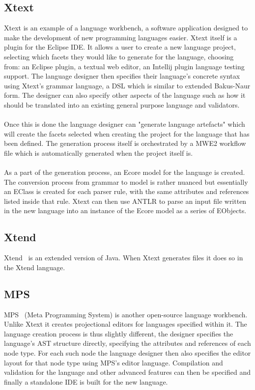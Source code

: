 \documentclass{article}
\begin{document}
\subsection{Xtext}
Xtext is an example of a language workbench, a software application designed to make the development of new programming languages easier. Xtext itself is a plugin for the Eclipse IDE. It allows a user to create a new language project, selecting which facets they would like to generate for the language, choosing from: an Eclipse plugin, a textual web editor, an Intellij plugin language testing support. The language designer then specifies their language's concrete syntax using Xtext's grammar language, a DSL which is similar to extended Bakus-Naur form. The designer can also specify other aspects of the language such as how it should be translated into an existing general purpose language and validators.
\\
\\
Once this is done the language designer can "generate language artefacts" which will create the facets selected when creating the project for the language that has been defined. The generation process itself is orchestrated by a MWE2 workflow file which is automatically generated when the project itself is.
\\
\\
As a part of the generation process, an Ecore model for the language is created. The conversion process from grammar to model is rather nuanced but essentially an EClass is created for each parser rule, with the same attributes and references listed inside that rule. Xtext can then use ANTLR to parse an input file written in the new language into an instance of the Ecore model as a series of EObjects.
\subsection{Xtend}
Xtend~\cite{xtend} is an extended version of Java. When Xtext generates files it does so in the Xtend language.
\subsection{MPS}
MPS~\cite{mps} (Meta Programming System) is another open-source language workbench. Unlike Xtext it creates projectional editors for languages specified within it. The language creation process is thus slightly different, the designer specifies the language's AST structure directly, specifying the attributes and references of each node type. For each such node the language designer then also specifies the editor layout for that node type using MPS's editor language. Compilation and validation for the language and other advanced features can then be specified and finally a standalone IDE is built for the new language.  
\end{document}

